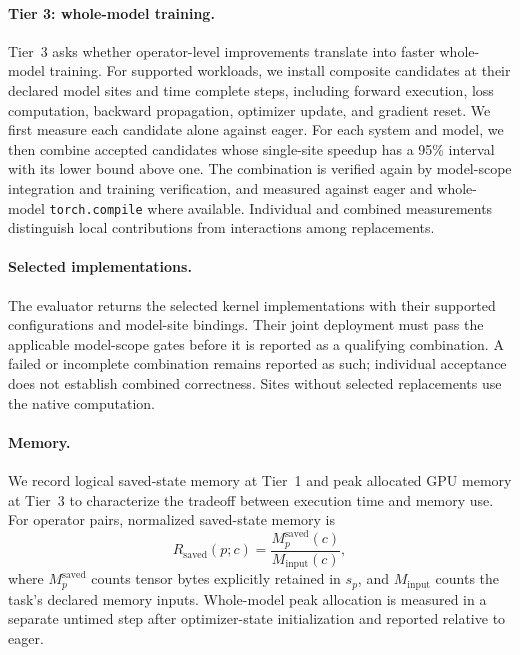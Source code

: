 \paragraph{Tier 3: whole-model training.}
Tier~3 asks whether operator-level improvements translate into faster whole-model training. For supported workloads, we install composite candidates at their declared model sites and time complete steps, including forward execution, loss computation, backward propagation, optimizer update, and gradient reset. We first measure each candidate alone against eager. For each system and model, we then combine accepted candidates whose single-site speedup has a 95\% interval with its lower bound above one. The combination is verified again by model-scope integration and training verification, and measured against eager and whole-model \texttt{torch.compile} where available. Individual and combined measurements distinguish local contributions from interactions among replacements.

\paragraph{Selected implementations.}
The evaluator returns the selected kernel implementations with their supported configurations and model-site bindings. Their joint deployment must pass the applicable model-scope gates before it is reported as a qualifying combination. A failed or incomplete combination remains reported as such; individual acceptance does not establish combined correctness. Sites without selected replacements use the native computation.

\paragraph{Memory.}
We record logical saved-state memory at Tier~1 and peak allocated GPU memory at Tier~3 to characterize the tradeoff between execution time and memory use. For operator pairs, normalized saved-state memory is
\begin{equation}
    R_{\mathrm{saved}}(p;c)
    =
    \frac{M_p^{\mathrm{saved}}(c)}
         {M_{\mathrm{input}}(c)},
    \label{eq:saved_memory_ratio}
\end{equation}
where $M_p^{\mathrm{saved}}$ counts tensor bytes explicitly retained in $s_p$, and $M_{\mathrm{input}}$ counts the task's declared memory inputs. Whole-model peak allocation is measured in a separate untimed step after optimizer-state initialization and reported relative to eager.

